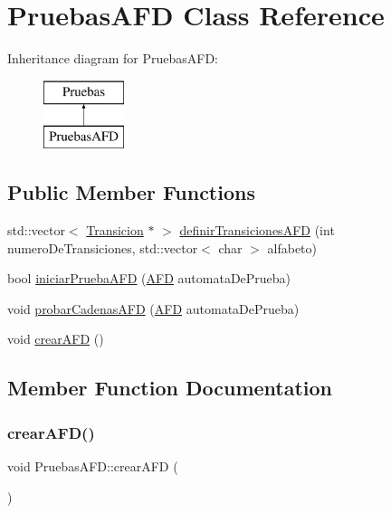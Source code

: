 \hypertarget{class_pruebas_a_f_d}{}\section{Pruebas\+A\+FD Class Reference}
\label{class_pruebas_a_f_d}
Inheritance diagram for Pruebas\+A\+FD\+:\begin{figure}[H]
\begin{center}
\leavevmode
\includegraphics[height=2.000000cm]{class_pruebas_a_f_d}
\end{center}
\end{figure}
\subsection*{Public Member Functions}
\begin{DoxyCompactItemize}
\item 
std\+::vector$<$ \hyperlink{class_transicion}{Transicion} $\ast$ $>$ \hyperlink{class_pruebas_a_f_d_a991ac328ebeae3ca84958887cbf4e41d}{definir\+Transiciones\+A\+FD} (int numero\+De\+Transiciones, std\+::vector$<$ char $>$ alfabeto)
\item 
bool \hyperlink{class_pruebas_a_f_d_ae8c9889569bc90bc8f55c3b09c4570eb}{iniciar\+Prueba\+A\+FD} (\hyperlink{class_a_f_d}{A\+FD} automata\+De\+Prueba)
\item 
void \hyperlink{class_pruebas_a_f_d_ab377ec9490bd437af165410a3ff10fd4}{probar\+Cadenas\+A\+FD} (\hyperlink{class_a_f_d}{A\+FD} automata\+De\+Prueba)
\item 
void \hyperlink{class_pruebas_a_f_d_acecc332248164ed9dc6b37029e0c0f33}{crear\+A\+FD} ()
\end{DoxyCompactItemize}


\subsection{Member Function Documentation}
\mbox{\label{class_pruebas_a_f_d_acecc332248164ed9dc6b37029e0c0f33}} 
\subsubsection{\texorpdfstring{crear\+A\+F\+D()}{crearAFD()}}
{\footnotesize\ttfamily void Pruebas\+A\+F\+D\+::crear\+A\+FD (\begin{DoxyParamCaption}{ }\end{DoxyParamCaption})}

